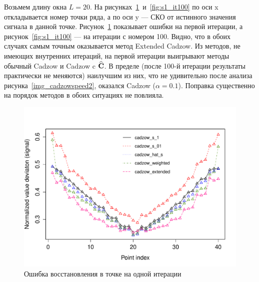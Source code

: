 \documentclass[12pt,a4paper,fleqn,leqno]{article}
\begin{document}
Возьмем длину окна $L=20$.  На рисунках~\ref{fig:s1_it1}~и~\ref{fig:s1_it100} по оси x откладывается номер точки ряда,
а по оси y --- СКО от истинного значения сигнала в данной точке. Рисунок~\ref{fig:s1_it1} показывает ошибки на первой итерации,
а рисунок~\ref{fig:s1_it100} --- на итерации с номером 100.
Видно, что в обоих случаях самым точным оказывается метод Extended Cadzow. Из методов, не имеющих внутренних итераций,
на первой итерации выигрывают методы обычный Cadzow и Cadzow c $\widehat{\mathbf{C}}$. В пределе (после 100-й итерации результаты практически не меняются)
наилучшим из них, что не удивительно после анализа рисунка~\ref{img_cadzowspeed2}, оказался Cadzow ($\alpha=0.1$). Поправка существенно на порядок методов в обоих ситуациях не повлияла.


\begin{figure}[!hhh] 
\begin{center}
\includegraphics[width = 15cm]{s1_it1.pdf}
\caption{Ошибка восстановления в точке на одной итерации}
\label{fig:s1_it1}
\end{center}
\end{figure}

\end{document}
